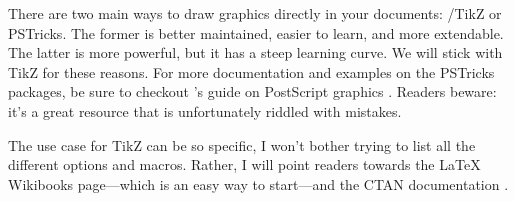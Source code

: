 There are two main ways to draw graphics directly in your documents: /TikZ or PSTricks. The former is better maintained, easier to learn, and more extendable. The latter is more powerful, but it has a steep learning curve. We will stick with TikZ for these reasons. For more documentation and examples on the PSTricks \glspl{package}, be sure to checkout 's guide on PostScript graphics \parencite{book:voss-graphics}. Readers beware: it's a great resource that is unfortunately riddled with mistakes.

The use case for TikZ can be so specific, I won't bother trying to list all the different options and \glspl{macro}. Rather, I will point readers towards the \LaTeX{} Wikibooks page---which is an easy way to start---and the \gls{CTAN} documentation \parencites{web:wikibooks-latex-tikz,web:ctan-tikz}.